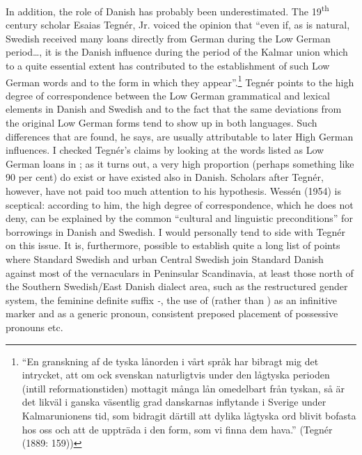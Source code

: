 In addition, the role of Danish has probably been underestimated. The 19\textsuperscript{th} century scholar Esaias Tegnér, Jr. voiced the opinion that “even if, as is natural, Swedish received many loans directly from German during the Low German period…, it is the Danish influence during the period of the Kalmar union which to a quite essential extent has contributed to the establishment of such Low German words and to the form in which they appear”.\footnote{ “En granskning af de tyska lånorden i vårt språk har bibragt mig det intrycket, att om ock svenskan naturligtvis under den lågtyska perioden (intill reformationstiden) mottagit många lån omedelbart från tyskan, så är det likväl i ganska väsentlig grad danskarnas inflytande i Sverige under Kalmarunionens tid, som bidragit därtill att dylika lågtyska ord blivit bofasta hos oss och att de uppträda i den form, som vi finna dem hava.” (Tegnér (1889: 159))} Tegnér points to the high degree of correspondence between the Low German grammatical and lexical elements in Danish and Swedish and to the fact that the same deviations from the original Low German forms tend to show up in both languages. Such differences that are found, he says, are usually attributable to later High German influences. I checked Tegnér’s claims by looking at the words listed as Low German loans in \citet{Hellquist1922}; as it turns out, a very high proportion (perhaps something like 90 per cent) do exist or have existed also in Danish. Scholars after Tegnér, however, have not paid too much attention to his hypothesis. Wessén (1954) is sceptical: according to him, the high degree of correspondence, which he does not deny, can be explained by the common “cultural and linguistic preconditions” for borrowings in Danish and Swedish. I would personally tend to side with Tegnér on this issue. It is, furthermore, possible to establish quite a long list of points where Standard Swedish and urban Central Swedish join Standard Danish against most of the vernaculars in Peninsular Scandinavia, at least those north of the Southern Swedish/East Danish dialect area, such as the restructured gender system, the feminine definite suffix\textit{ {}-}, the use of  (rather than ) as an infinitive marker and  as a generic pronoun, consistent preposed placement of possessive pronouns etc. 




